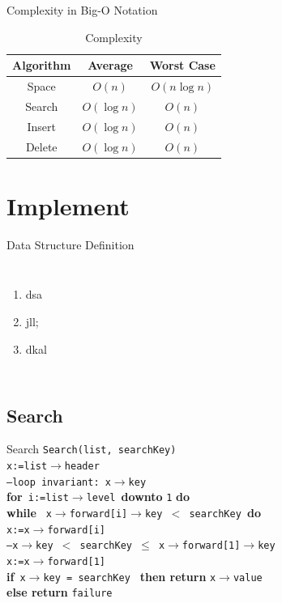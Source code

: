 \documentclass[12pt]{beamer}
\begin{document}
\begin{frame}{Complexity in Big-O Notation}
\begin{table}[h]
\centering
\begin{tabular}{ccc}
Algorithm & Average & Worst Case \\
\hline
Space & $O(n)$ & $O(n\log n)$\cite{papadakis1993skip} \\
\hline
Search & $O(\log n)$ & $O(n)$\cite{papadakis1993skip} \\
\hline
Insert & $O(\log n)$ & $O(n)$ \\ 
\hline
Delete & $O(\log n)$ & $O(n)$ \\
\hline
\end{tabular}
\caption{Complexity}
\end{table}
\end{frame}
\section{Implement}
\begin{frame}{Data Structure Definition}
	\begin{columns}
		
		\begin{enumerate}
			\item dsa
			\item jll;
			\item dkal
		\end{enumerate}
	\end{columns}
\end{frame}

\subsection{Search}
\begin{frame}{Search}
\texttt{Search(list, searchKey)} \\
\quad\texttt{x:=list$\rightarrow$header} \\
\quad\texttt{--loop invariant: x$\rightarrow$key} \\
\quad\textbf{for}\texttt{ i:=list$\rightarrow$level }\textbf{downto} \texttt{1} \textbf{do} \\
\quad \quad \textbf{while} \texttt{ x$\rightarrow$forward[i]$\rightarrow$key $<$ searchKey }\textbf{do} \\
\quad\quad\quad \texttt{x:=x$\rightarrow$forward[i]} \\
\quad \texttt{--x$\rightarrow$key $<$ searchKey $\leq$ x$\rightarrow$forward[1]$\rightarrow$key} \\
\quad \texttt{x:=x$\rightarrow$forward[1]} \\
\quad \textbf{if}\texttt{ x$\rightarrow$key = searchKey } \textbf{then return }\texttt{x$\rightarrow$value} \\
\quad\quad \textbf{else return } \texttt{failure}
\end{frame}
\end{document}
